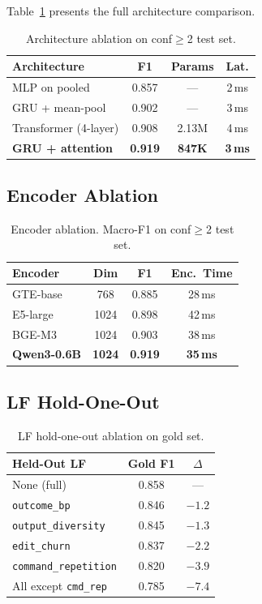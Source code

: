 \documentclass[11pt,a4paper]{article}
\begin{document}
Table~\ref{tab:arch-full} presents the full architecture comparison.

\begin{table}[h]
\centering
\small
\begin{tabular}{lccc}
\toprule
\textbf{Architecture} & \textbf{F1} & \textbf{Params} & \textbf{Lat.} \\
\midrule
MLP on pooled & 0.857 & --- & 2\,ms \\
GRU + mean-pool & 0.902 & --- & 3\,ms \\
Transformer (4-layer) & 0.908 & 2.13M & 4\,ms \\
\textbf{GRU + attention} & \textbf{0.919} & \textbf{847K} & \textbf{3\,ms} \\
\bottomrule
\end{tabular}
\caption{Architecture ablation on conf$\geq$2 test set.}
\label{tab:arch-full}
\end{table}

\subsection{Encoder Ablation}
\label{app:encoder}

\begin{table}[h]
\centering
\small
\begin{tabular}{lccc}
\toprule
\textbf{Encoder} & \textbf{Dim} & \textbf{F1} & \textbf{Enc.\ Time} \\
\midrule
GTE-base & 768 & 0.885 & 28\,ms \\
E5-large & 1024 & 0.898 & 42\,ms \\
BGE-M3 & 1024 & 0.903 & 38\,ms \\
\textbf{Qwen3-0.6B} & \textbf{1024} & \textbf{0.919} & \textbf{35\,ms} \\
\bottomrule
\end{tabular}
\caption{Encoder ablation. Macro-F1 on conf$\geq$2 test set.}
\label{tab:encoder}
\end{table}

\subsection{LF Hold-One-Out}
\label{app:lf-holdout}

\begin{table}[h]
\centering
\small
\begin{tabular}{lcc}
\toprule
\textbf{Held-Out LF} & \textbf{Gold F1} & \textbf{$\Delta$} \\
\midrule
None (full) & 0.858 & --- \\
\texttt{outcome\_bp} & 0.846 & $-1.2$ \\
\texttt{output\_diversity} & 0.845 & $-1.3$ \\
\texttt{edit\_churn} & 0.837 & $-2.2$ \\
\texttt{command\_repetition} & 0.820 & $-3.9$ \\
All except \texttt{cmd\_rep} & 0.785 & $-7.4$ \\
\bottomrule
\end{tabular}
\caption{LF hold-one-out ablation on gold set.}
\label{tab:lf-holdout}
\end{table}
\end{document}

